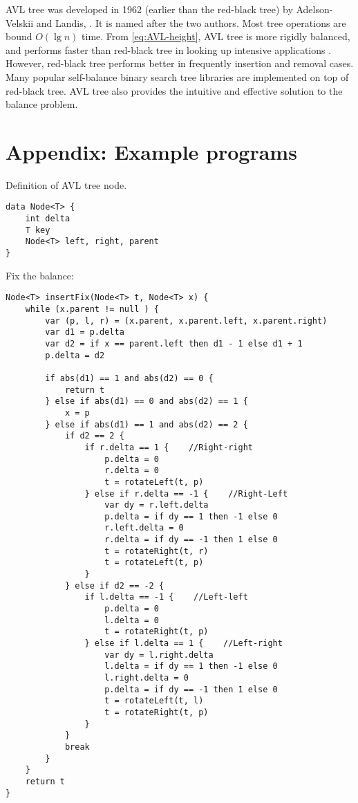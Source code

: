 \documentclass[b5paper]{article}
\begin{document}
AVL tree was developed in 1962 (earlier than the red-black tree) by Adelson-Velskii and Landis\cite{wiki-avl}, \cite{TFATP}. It is named after the two authors. Most tree operations are bound $O(\lg n)$ time. From \cref{eq:AVL-height}, AVL tree is more rigidly balanced, and performs faster than red-black tree in looking up intensive applications \cite{wiki-avl}. However, red-black tree performs better in frequently insertion and removal cases. Many popular self-balance binary search tree libraries are implemented on top of red-black tree. AVL tree also provides the intuitive and effective solution to the balance problem.

\section{Appendix: Example programs}

Definition of AVL tree node.

\begin{lstlisting}[language = Bourbaki]
data Node<T> {
    int delta
    T key
    Node<T> left, right, parent
}
\end{lstlisting}

Fix the balance:

\begin{lstlisting}[language = Bourbaki]
Node<T> insertFix(Node<T> t, Node<T> x) {
    while (x.parent != null ) {
        var (p, l, r) = (x.parent, x.parent.left, x.parent.right)
        var d1 = p.delta
        var d2 = if x == parent.left then d1 - 1 else d1 + 1
        p.delta = d2

        if abs(d1) == 1 and abs(d2) == 0 {
            return t
        } else if abs(d1) == 0 and abs(d2) == 1 {
            x = p
        } else if abs(d1) == 1 and abs(d2) == 2 {
            if d2 == 2 {
                if r.delta == 1 {    //Right-right
                    p.delta = 0
                    r.delta = 0
                    t = rotateLeft(t, p)
                } else if r.delta == -1 {    //Right-Left
                    var dy = r.left.delta
                    p.delta = if dy == 1 then -1 else 0
                    r.left.delta = 0
                    r.delta = if dy == -1 then 1 else 0
                    t = rotateRight(t, r)
                    t = rotateLeft(t, p)
                }
            } else if d2 == -2 {
                if l.delta == -1 {    //Left-left
                    p.delta = 0
                    l.delta = 0
                    t = rotateRight(t, p)
                } else if l.delta == 1 {    //Left-right
                    var dy = l.right.delta
                    l.delta = if dy == 1 then -1 else 0
                    l.right.delta = 0
                    p.delta = if dy == -1 then 1 else 0
                    t = rotateLeft(t, l)
                    t = rotateRight(t, p)
                }
            }
            break
        }
    }
    return t
}
\end{lstlisting}
\end{document}
